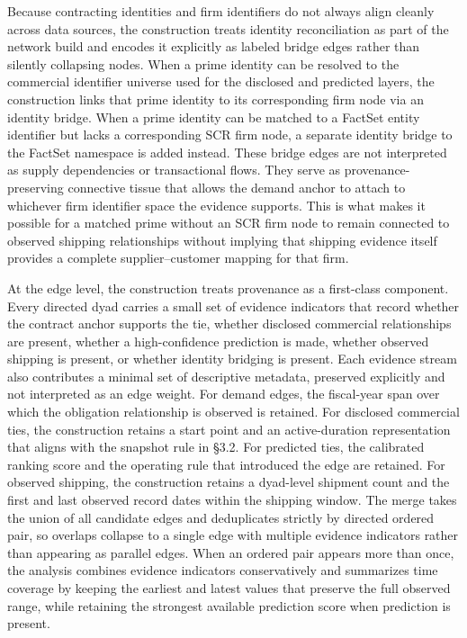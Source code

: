 Because contracting identities and firm identifiers do not always align cleanly across data sources, the construction treats identity reconciliation as part of the network build and encodes it explicitly as labeled bridge edges rather than silently collapsing nodes. When a prime identity can be resolved to the commercial identifier universe used for the disclosed and predicted layers, the construction links that prime identity to its corresponding firm node via an identity bridge. When a prime identity can be matched to a FactSet entity identifier but lacks a corresponding SCR firm node, a separate identity bridge to the FactSet namespace is added instead. These bridge edges are not interpreted as supply dependencies or transactional flows. They serve as provenance-preserving connective tissue that allows the demand anchor to attach to whichever firm identifier space the evidence supports. This is what makes it possible for a matched prime without an SCR firm node to remain connected to observed shipping relationships without implying that shipping evidence itself provides a complete supplier--customer mapping for that firm.

At the edge level, the construction treats provenance as a first-class component. Every directed dyad carries a small set of evidence indicators that record whether the contract anchor supports the tie, whether disclosed commercial relationships are present, whether a high-confidence prediction is made, whether observed shipping is present, or whether identity bridging is present. Each evidence stream also contributes a minimal set of descriptive metadata, preserved explicitly and not interpreted as an edge weight. For demand edges, the fiscal-year span over which the obligation relationship is observed is retained. For disclosed commercial ties, the construction retains a start point and an active-duration representation that aligns with the snapshot rule in \S3.2. For predicted ties, the calibrated ranking score and the operating rule that introduced the edge are retained. For observed shipping, the construction retains a dyad-level shipment count and the first and last observed record dates within the shipping window. The merge takes the union of all candidate edges and deduplicates strictly by directed ordered pair, so overlaps collapse to a single edge with multiple evidence indicators rather than appearing as parallel edges. When an ordered pair appears more than once, the analysis combines evidence indicators conservatively and summarizes time coverage by keeping the earliest and latest values that preserve the full observed range, while retaining the strongest available prediction score when prediction is present.

